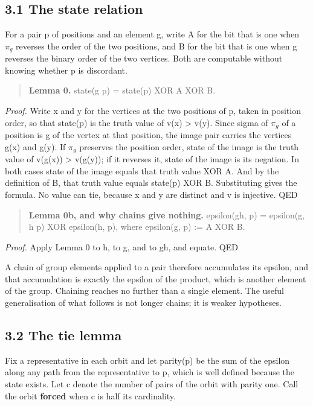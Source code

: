 \documentclass[11pt,a4paper]{article}
\begin{document}
\subsection*{3.1 The state relation}

For a pair p of positions and an element g, write A for the bit that is one when $\pi_g$ reverses the order of the two positions, and B for the bit that is one when g reverses the binary order of the two vertices. Both are computable without knowing whether p is discordant.

\begin{quote}
\textbf{Lemma 0.} state(g p) = state(p) XOR A XOR B.
\end{quote}

\emph{Proof.} Write x and y for the vertices at the two positions of p, taken in position order, so that state(p) is the truth value of v(x) > v(y). Since sigma of $\pi_g$ of a position is g of the vertex at that position, the image pair carries the vertices g(x) and g(y). If $\pi_g$ preserves the position order, state of the image is the truth value of v(g(x)) > v(g(y)); if it reverses it, state of the image is its negation. In both cases state of the image equals that truth value XOR A. And by the definition of B, that truth value equals state(p) XOR B. Substituting gives the formula. No value can tie, because x and y are distinct and v is injective. QED

\begin{quote}
\textbf{Lemma 0b, and why chains give nothing.} epsilon(gh, p) = epsilon(g, h p) XOR epsilon(h, p), where epsilon(g, p) := A XOR B.
\end{quote}

\emph{Proof.} Apply Lemma 0 to h, to g, and to gh, and equate. QED

A chain of group elements applied to a pair therefore accumulates its epsilon, and that accumulation is exactly the epsilon of the product, which is another element of the group. Chaining reaches no further than a single element. The useful generalisation of what follows is not longer chains; it is weaker hypotheses.

\subsection*{3.2 The tie lemma}

Fix a representative in each orbit and let parity(p) be the sum of the epsilon along any path from the representative to p, which is well defined because the state exists. Let c denote the number of pairs of the orbit with parity one. Call the orbit \textbf{forced} when c is half its cardinality.
\end{document}
